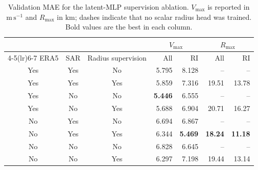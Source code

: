 \begin{table}[t]
    \centering
    \caption{Validation MAE for the latent-MLP supervision ablation. $V_{\max}$ is
    reported in $\mathrm{m\,s^{-1}}$ and $R_{\max}$ in $\mathrm{km}$; dashes
    indicate that no scalar radius head was trained. Bold values are the best
    in each column.}
    \label{tab:latent-supervision-ablation}
    \small
    \setlength{\tabcolsep}{5pt}
    \begin{tabular}{cccrrrr}
        \toprule
        & & & \multicolumn{2}{c}{$V_{\max}$} &
        \multicolumn{2}{c}{$R_{\max}$} \\
        \cmidrule(lr){4-5}\cmidrule(lr){6-7}
        ERA5 & SAR & Radius supervision & All & RI & All & RI \\
        \midrule
        Yes & Yes & No  & 5.795 & 8.128 & -- & -- \\
        Yes & Yes & Yes & 5.859 & 7.316 & 19.51 & 13.78 \\
        Yes & No  & No  & \textbf{5.446} & 6.555 & -- & -- \\
        Yes & No  & Yes & 5.688 & 6.904 & 20.71 & 16.27 \\
        \midrule
        No & Yes & No  & 6.694 & 6.867 & -- & -- \\
        No & Yes & Yes & 6.344 & \textbf{5.469} & \textbf{18.24} & \textbf{11.18} \\
        No & No  & No  & 6.828 & 6.645 & -- & -- \\
        No & No  & Yes & 6.297 & 7.198 & 19.44 & 13.14 \\
        \bottomrule
    \end{tabular}
\end{table}
